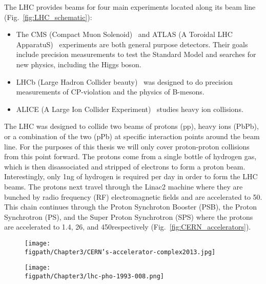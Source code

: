 The LHC provides beams for four main experiments located along its beam line (Fig.~\ref{fig:LHC_schematic}):
\begin{itemize}
    \item The CMS (Compact Muon Solenoid)~\cite{Chatrchyan:2008aa} and ATLAS (A Toroidal LHC ApparatuS)~\cite{1748-0221-3-08-S08003} experiments are both general purpose detectors. Their goals include precision measurements to test the Standard Model and searches for new physics, including the Higgs boson.
    \item LHCb (Large Hadron Collider beauty)~\cite{Alves:2008zz} was designed to do precision measurements of CP-violation and the physics of B-mesons.
    \item ALICE (A Large Ion Collider Experiment)~\cite{Aamodt:2008zz} studies heavy ion collisions.
\end{itemize}

The LHC was designed to collide two beams of protons (pp), heavy ions (PbPb), or a combination of the two (pPb) at specific interaction points around the beam line.
For the purposes of this thesis we will only cover proton-proton collisions from this point forward.
The protons come from a single bottle of hydrogen gas, which is then disassociated and stripped of electrons to form a proton beam.
Interestingly, only 1\unit{ng} of hydrogen is required per day in order to form the LHC beams.
The protons next travel through the Linac2 machine where they are bunched by radio frequency (RF) electromagnetic fields and are accelerated to 50\MeV.
This chain continues through the Proton Synchroton Booster (PSB), the Proton Synchrotron (PS), and the Super Proton Synchrotron (SPS) where the protons are accelerated to 1.4\GeV, 26\GeV, and 450\GeV respectively (Fig.~\ref{fig:CERN_accelerators}).

\begin{sidewaysfigure}[!hbt]
    \centering
    \begin{subfigure}[t]{0.4655\textwidth}
        \texttt{[image: \\figpath/Chapter3/CERN's-accelerator-complex2013.jpg]}
        \label{fig:CERN_accelerator_complex}
    \end{subfigure}
    \begin{subfigure}[t]{0.4655\textwidth}
        \texttt{[image: \\figpath/Chapter3/lhc-pho-1993-008.png]}
        \label{fig:LHC_LEP_injection_complex}
    \end{subfigure}
    \caption{Left: A schematic of the CERN accelerator complex~\cite{Marcastel:1621583}. Right: A diagram of the LHC injection chain. Also included is a diagram of the heavy ion and LEP injection chains~\cite{Jean-Luc:841568}.}
    \label{fig:CERN_accelerators}
\end{sidewaysfigure}

